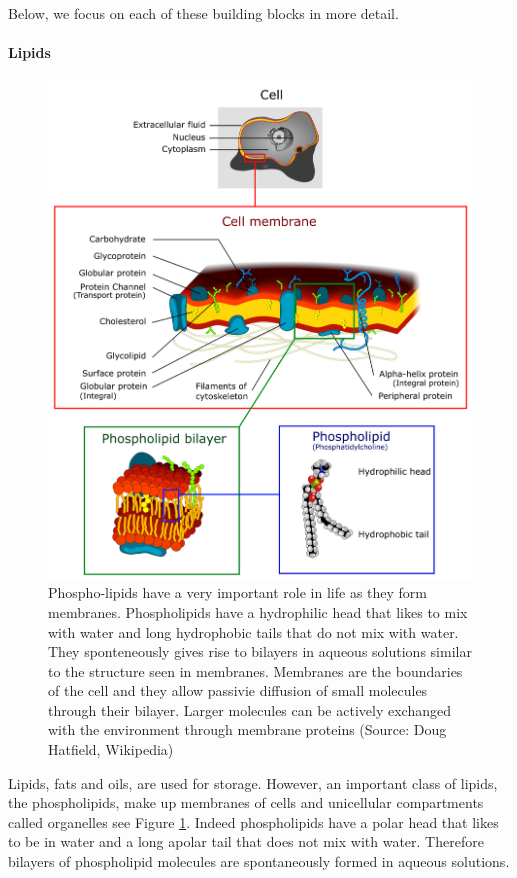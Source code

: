 \documentclass[
  11pt,
]{book}
\begin{document}
Below, we focus on each of these building blocks in more detail.

\hypertarget{lipids}{%
\paragraph{Lipids}\label{lipids}}

\begin{figure}

{\centering \includegraphics[width=0.8\linewidth]{./figs/Cell_membrane_detailed_diagram_4} 

}

\caption{Phospho-lipids have a very important role in life as they form membranes. Phospholipids have a hydrophilic head that likes to mix with water and long hydrophobic tails that do not mix with water. They sponteneously gives rise to bilayers in aqueous solutions similar to the structure seen in membranes. Membranes are the boundaries of the cell and they allow passivie diffusion of small molecules through their bilayer. Larger molecules can be actively exchanged with the environment through membrane proteins (Source: Doug Hatfield, Wikipedia)}\label{fig:lipids}
\end{figure}

Lipids, fats and oils, are used for storage. However, an important class of lipids, the phospholipids, make up membranes of cells and unicellular compartments called organelles see Figure \ref{fig:lipids}. Indeed phospholipids have a polar head that likes to be in water and a long apolar tail that does not mix with water. Therefore bilayers of phospholipid molecules are spontaneously formed in aqueous solutions.
\end{document}

